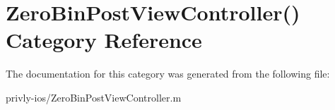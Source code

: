 \hypertarget{category_zero_bin_post_view_controller_07_08}{\section{Zero\-Bin\-Post\-View\-Controller() Category Reference}
\label{category_zero_bin_post_view_controller_07_08}
}


The documentation for this category was generated from the following file\-:\begin{DoxyCompactItemize}
\item 
privly-\/ios/Zero\-Bin\-Post\-View\-Controller.\-m\end{DoxyCompactItemize}
